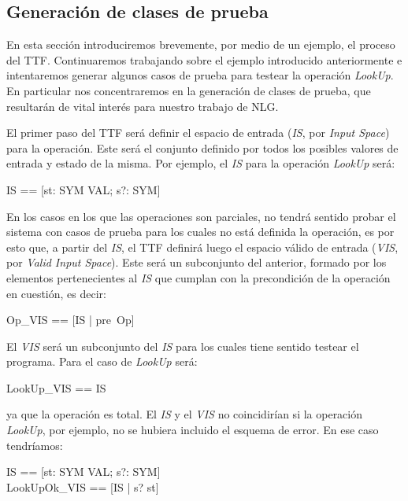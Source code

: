 \subsection{Generación de clases de prueba}
\label{sec:tacticas-testing}

En esta sección introduciremos brevemente, por medio de un ejemplo, el proceso del TTF. Continuaremos trabajando sobre el ejemplo introducido anteriormente e intentaremos generar algunos casos de prueba para testear la operación \emph{LookUp}. En particular nos concentraremos en la generación de clases de prueba, que resultarán de vital interés para nuestro trabajo de NLG.

El primer paso del TTF será definir el espacio de entrada (\emph{IS}, por \emph{Input Space}) para la operación. Este será el conjunto definido por todos los posibles valores de entrada y estado de la misma. Por ejemplo, el \emph{IS} para la operación \emph{LookUp} será:

\begin{zed}
  IS == [st: SYM \pfun VAL; s?: SYM]
\end{zed}

En los casos en los que las operaciones son parciales, no tendrá sentido probar el sistema con casos de prueba para los cuales no está definida la operación, es por esto que, a partir del \emph{IS}, el TTF definirá luego el espacio válido de entrada (\emph{VIS}, por \emph{Valid Input Space}). Este será un subconjunto del anterior, formado por los elementos pertenecientes al \emph{IS} que cumplan con la precondición de la operación en cuestión, es decir:

\begin{zed}
  Op\_VIS == [IS | pre~Op]
\end{zed}

El \emph{VIS} será un subconjunto del \emph{IS} para los cuales tiene sentido testear el programa. Para el caso de \emph{LookUp} será:

\begin{zed}
  LookUp\_VIS == IS
\end{zed}

\noindent
ya que la operación es total. El \emph{IS} y el \emph{VIS} no coincidirían si la operación \emph{LookUp}, por ejemplo, no se hubiera incluido el esquema de error. En ese caso tendríamos:

\begin{zed}
  IS == [st: SYM \pfun VAL; s?: SYM] \\
  LookUpOk\_VIS == [IS | s? \in \dom st]
\end{zed}

